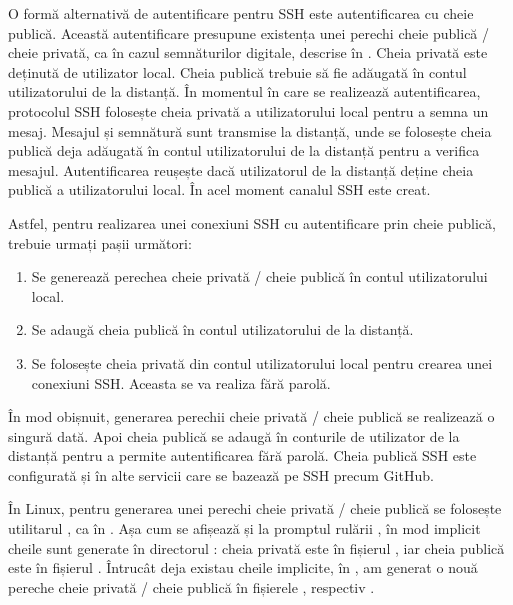 O formă alternativă de autentificare pentru SSH este autentificarea cu cheie publică.
Această autentificare presupune existența unei perechi cheie publică / cheie privată, ca în cazul semnăturilor digitale, descrise în .
Cheia privată este deținută de utilizator local.
Cheia publică trebuie să fie adăugată în contul utilizatorului de la distanță.
În momentul în care se realizează autentificarea, protocolul SSH folosește cheia privată a utilizatorului local pentru a semna un mesaj. Mesajul și semnătură sunt transmise la distanță, unde se folosește cheia publică deja adăugată în contul utilizatorului de la distanță pentru a verifica mesajul.
Autentificarea reușește dacă utilizatorul de la distanță deține cheia publică a utilizatorului local.
În acel moment canalul SSH este creat.

Astfel, pentru realizarea unei conexiuni SSH cu autentificare prin cheie publică, trebuie urmați pașii următori:
\begin{enumerate}
  \item Se generează perechea cheie privată / cheie publică în contul utilizatorului local.
  \item Se adaugă cheia publică în contul utilizatorului de la distanță.
  \item Se folosește cheia privată din contul utilizatorului local pentru crearea unei conexiuni SSH. Aceasta se va realiza fără parolă.
\end{enumerate}

În mod obișnuit, generarea perechii cheie privată / cheie publică se realizează o singură dată.
Apoi cheia publică se adaugă în conturile de utilizator de la distanță pentru a permite autentificarea fără parolă.
Cheia publică SSH este configurată și în alte servicii care se bazează pe SSH precum GitHub.

În Linux, pentru generarea unei perechi cheie privată / cheie publică se folosește utilitarul , ca în .
Așa cum se afișează și la promptul rulării , în mod implicit cheile sunt generate în directorul : cheia privată este în fișierul , iar cheia publică este în fișierul .
Întrucât deja existau cheile implicite, în , am generat o nouă pereche cheie privată / cheie publică în fișierele , respectiv .

